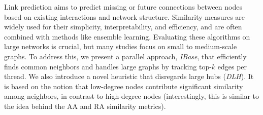Link prediction aims to predict missing or future connections between nodes based on existing interactions and network structure. Similarity measures are widely used for their simplicity, interpretability, and efficiency, and are often combined with methods like ensemble learning. Evaluating these algorithms on large networks is crucial, but many studies focus on small to medium-scale graphs. To address this, we present a parallel approach, \textit{IBase}, that efficiently finds common neighbors and handles large graphs by tracking top-$k$ edges per thread. We also introduce a novel heuristic that disregards large hubs (\textit{DLH}). It is based on the notion that low-degree nodes contribute significant similarity among neighbors, in contrast to high-degree nodes (interestingly, this is similar to the idea behind the AA and RA similarity metrics).

